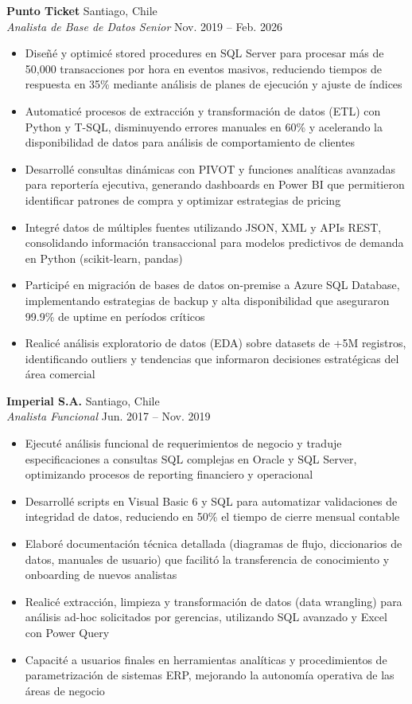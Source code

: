 \documentclass[11pt,letterpaper]{article}
\begin{document}
\textbf{Punto Ticket} \hfill Santiago, Chile\\
\textit{Analista de Base de Datos Senior} \hfill Nov. 2019 – Feb. 2026
\begin{itemize}
  \item Diseñé y optimicé stored procedures en SQL Server para procesar más de 50,000 transacciones por hora en eventos masivos, reduciendo tiempos de respuesta en 35\% mediante análisis de planes de ejecución y ajuste de índices
  \item Automaticé procesos de extracción y transformación de datos (ETL) con Python y T-SQL, disminuyendo errores manuales en 60\% y acelerando la disponibilidad de datos para análisis de comportamiento de clientes
  \item Desarrollé consultas dinámicas con PIVOT y funciones analíticas avanzadas para reportería ejecutiva, generando dashboards en Power BI que permitieron identificar patrones de compra y optimizar estrategias de pricing
  \item Integré datos de múltiples fuentes utilizando JSON, XML y APIs REST, consolidando información transaccional para modelos predictivos de demanda en Python (scikit-learn, pandas)
  \item Participé en migración de bases de datos on-premise a Azure SQL Database, implementando estrategias de backup y alta disponibilidad que aseguraron 99.9\% de uptime en períodos críticos
  \item Realicé análisis exploratorio de datos (EDA) sobre datasets de +5M registros, identificando outliers y tendencias que informaron decisiones estratégicas del área comercial
\end{itemize}
\vspace{2pt}
\textbf{Imperial S.A.} \hfill Santiago, Chile\\
\textit{Analista Funcional} \hfill Jun. 2017 – Nov. 2019
\begin{itemize}
  \item Ejecuté análisis funcional de requerimientos de negocio y traduje especificaciones a consultas SQL complejas en Oracle y SQL Server, optimizando procesos de reporting financiero y operacional
  \item Desarrollé scripts en Visual Basic 6 y SQL para automatizar validaciones de integridad de datos, reduciendo en 50\% el tiempo de cierre mensual contable
  \item Elaboré documentación técnica detallada (diagramas de flujo, diccionarios de datos, manuales de usuario) que facilitó la transferencia de conocimiento y onboarding de nuevos analistas
  \item Realicé extracción, limpieza y transformación de datos (data wrangling) para análisis ad-hoc solicitados por gerencias, utilizando SQL avanzado y Excel con Power Query
  \item Capacité a usuarios finales en herramientas analíticas y procedimientos de parametrización de sistemas ERP, mejorando la autonomía operativa de las áreas de negocio
\end{itemize}
\end{document}
